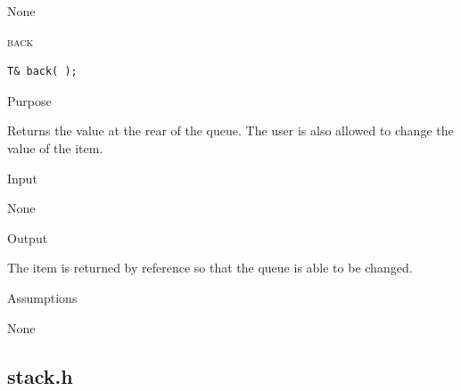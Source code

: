 \documentclass[pdftex, 11pt]{article}
\begin{document}
\begin{description}
\begin{description}
				None

		\end{description}
	\item{\textsc{back}}

		\begin{lstlisting}
T& back( );
		\end{lstlisting}

		\begin{description}
			\item{Purpose}

				Returns the value at the rear of the queue. The
				user is also allowed to change the value of the
				item.

			\item{Input}

				None

			\item{Output}
				
				The item is returned by reference so that the
				queue is able to be changed.

			\item{Assumptions}

				None

		\end{description}


\end{description}

\subsection{stack.h}
\end{document}
